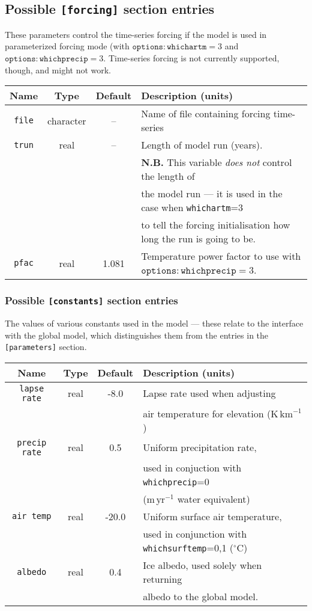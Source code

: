 \subsection{Possible \texttt{[forcing]} section entries}
%
These parameters control the time-series forcing if the model is used in
parameterized forcing mode (with $\mathtt{options:whichartm}=3$ and
$\mathtt{options:whichprecip}=3$. Time-series forcing is not currently
supported, though, and might not work.
%
\begin{center}
\begin{tabular}{|c|c|c|l|}
\hline
Name & Type & Default & Description (units)\\
\hline
\hline
\texttt{file} & character & -- & Name of file containing forcing time-series
\\
\hline
\texttt{trun} & real & -- & Length of model run (years).\\
 & & & {\bf N.B.} This variable {\em does not} control the length of \\
 & & & the model run --- it is used in the case when \texttt{whichartm}=3 \\
 & & & to tell the forcing initialisation how long the run is going to be. \\
\hline
\texttt{pfac} & real & 1.081 & Temperature power factor to use with
$\mathtt{options:whichprecip}=3$. \\
\hline
\end{tabular}
\end{center}
%
\subsubsection{Possible \texttt{[constants]} section entries}
%
The values of various constants used in the model --- these relate to the
interface with the global model, which distinguishes them from the entries in
the \texttt{[parameters]} section.
%
\begin{center}
\begin{tabular}{|c|c|c|l|}
\hline
Name & Type & Default & Description (units)\\
\hline
\hline
\texttt{lapse rate} & real & -8.0 & Lapse rate used when adjusting \\
 & & & air temperature for elevation ($\mathrm{K}\,\mathrm{km}^{-1}$) \\
\hline
\texttt{precip rate} & real & 0.5 & Uniform precipitation rate,
\\
 & & & used in conjuction with \texttt{whichprecip}=0 \\
 & & & ($\mathrm{m}\,\mathrm{yr}^{-1}$ water equivalent) \\
\hline
\texttt{air temp} & real & -20.0 & Uniform surface air temperature, \\
 & & & used in conjunction with \texttt{whichsurftemp}=0,1 ($^{\circ}\mathrm{C}$) \\
\hline
\texttt{albedo} & real & 0.4 & Ice albedo, used solely when returning \\
 & & & albedo to the global model. \\
\hline
\end{tabular}
\end{center}
%
